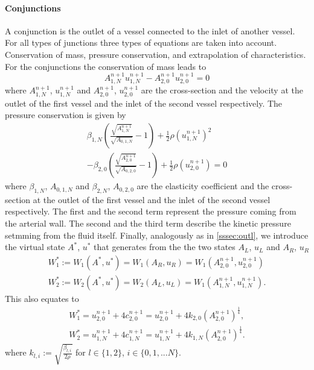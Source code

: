 \documentclass[a4paper, oneside]{discothesis}
\begin{document}
	\paragraph{Conjunctions} \label{par:conjunctions}
	A conjunction is the outlet of a vessel connected to the inlet of another vessel.
	For all types of junctions three types of equations are taken into account. 
	Conservation of mass, pressure conservation, and extrapolation of characteristics.
	For the conjunctions the conservation of mass leads to 
	\begin{equation}
		A_{1,N}^{n+1} u_{1,N}^{n+1} - A_{2,0}^{n+1} u_{2,0}^{n+1}=0
	\end{equation}
	where $A_{1,N}^{n+1}$, $u_{1,N}^{n+1}$ and $A_{2,0}^{n+1}$, $u_{2,0}^{n+1}$ are the cross-section and the velocity at the outlet of the first vessel and the inlet of the second vessel respectively.
	The pressure conservation is given by 
	\begin{multline}
		\beta_{1,N} \left( \frac{\sqrt{A_{1,N}^{n+1}}}{\sqrt{A_{0,1,N}}}-1\right)+\frac{1}{2} \rho \left( u_{1,N}^{n+1} \right) ^2 \\
		-\beta_{2,0} \left( \frac{\sqrt{A_{2,0}^{n+1}}}{\sqrt{A_{0,2,0}}}-1\right)+\frac{1}{2} \rho \left( u_{2,0}^{n+1} \right)=0
	\end{multline}
	where $\beta_{1,N}$, $A_{0,1,N}$ and $\beta_{2,N}$, $A_{0,2,0}$ are the elasticity coefficient and the cross-section at the outlet of the first vessel and the inlet of the second vessel respectively.
	The first and the second term represent the pressure coming from the arterial wall.
	The second and the third term describe the kinetic pressure setmming from the fluid itself.
	Finally, analogously as in \autoref{sssec:outl}, we introduce the virtual state $A^*$, $u^*$ that generates from the the two states $A_L$, $u_L$ and $A_R$, $u_R$
	\begin{align}
		W_1^* := W_1(A^*,u^*) = W_1(A_R,u_R) = W_1(A_{2,0}^{n+1}, u_{2,0}^{n+1}) \\
		W_2^* := W_2(A^*,u^*) = W_2(A_L,u_L) = W_1(A_{1,N}^{n+1}, u_{1,N}^{n+1}).
	\end{align}
	This also equates to 
	\begin{align}
		W_1^* = u_{2,0}^{n+1} + 4c_{2,0}^{n+1} = u_{2,0}^{n+1} + 4k_{2,0} \left( A_{2,0}^{n+1} \right)^{\frac{1}{4}}, \\
		W_2^* = u_{1,N}^{n+1} + 4c_{1,N}^{n+1} = u_{1,N}^{n+1} + 4k_{1,N} \left( A_{2,0}^{n+1} \right)^{\frac{1}{4}}.
	\end{align}
	where $k_{l,i} := \sqrt{\frac{\beta_{l,i}}{2\rho}}$ for $l \in \{1,2\}$, $i \in \{0,1,...N\}$.
\end{document}
